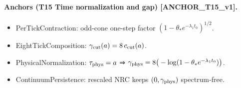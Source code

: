 \documentclass[11pt]{amsart}
\begin{document}
\paragraph{Anchors (T15 Time normalization and gap) [ANCHOR\_T15\_v1].}
\begin{itemize}
  \item PerTickContraction: odd-cone one-step factor $(1-\theta_* e^{-\lambda_1 t_0})^{1/2}$.
  \item EightTickComposition: $\gamma_{\rm cut}(a)=8\,c_{\rm cut}(a)$.
  \item PhysicalNormalization: $\tau_{\rm phys}=a$ ⇒ $\gamma_{\rm phys}=8\big(-\log(1-\theta_* e^{-\lambda_1 t_0})\big)$.
  \item ContinuumPersistence: rescaled NRC keeps $(0,\gamma_{\rm phys})$ spectrum‑free.
\end{itemize}
\end{document}
